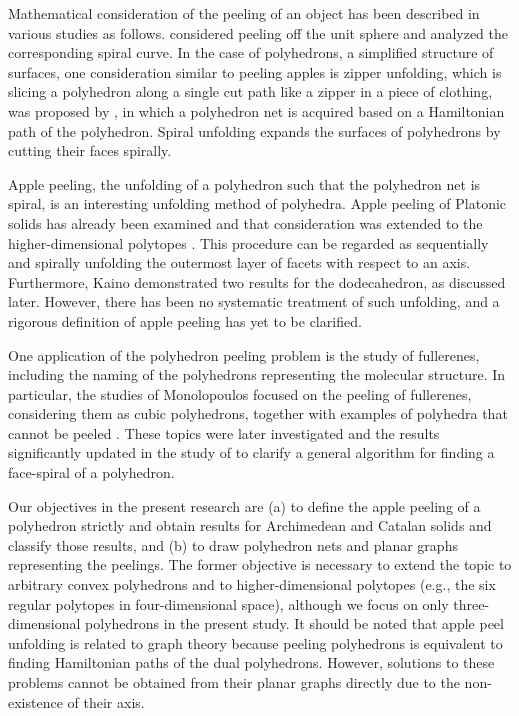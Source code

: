 \documentclass[]{interact}
\theoremstyle{plain}%
\theoremstyle{definition}
\theoremstyle{remark}
\begin{document}
Mathematical consideration of the peeling of an object has been described in various studies as follows. \cite{Bartholdi2012} considered peeling off the unit sphere and analyzed the corresponding spiral curve. In the case of polyhedrons, a simplified structure of surfaces, one consideration similar to peeling apples is zipper unfolding, which is slicing a polyhedron along a single cut path like a zipper in a piece of clothing, was proposed by \cite{Demaine2010}, in which a polyhedron net is acquired based on a Hamiltonian path of the polyhedron. Spiral unfolding \cite{O'Rourke2015} expands the surfaces of polyhedrons by cutting their faces spirally.

Apple peeling, the unfolding of a polyhedron such that the polyhedron net is spiral, is an interesting unfolding method of polyhedra. Apple peeling of Platonic solids has already been examined and that consideration was extended to the higher-dimensional polytopes \citep{Kaino2019}. This procedure can be regarded as sequentially and spirally unfolding the outermost layer of facets with respect to an axis. Furthermore, Kaino demonstrated two results for the dodecahedron, as discussed later. However, there has been no systematic treatment of such unfolding, and a rigorous definition of apple peeling has yet to be clarified. 

One application of the polyhedron peeling problem is the study of fullerenes, including the naming of the polyhedrons representing the molecular structure. In particular, the studies of Monolopoulos \citep{Manolopoulos1991} focused on the peeling of fullerenes, considering them as cubic polyhedrons, together with examples of polyhedra that cannot be peeled \citep{Manolopoulos1993}. These topics were later investigated and the results significantly updated in the study of \cite{WSA2018} to clarify a general algorithm for finding a face-spiral of a polyhedron.


Our objectives in the present research are (a) to define the apple peeling of a polyhedron strictly and obtain results for Archimedean and Catalan solids and classify those results, and
(b) to draw polyhedron nets and planar graphs representing the peelings. 
The former objective is necessary to extend the topic to arbitrary convex polyhedrons and to higher-dimensional polytopes (e.g., the six regular polytopes in four-dimensional space), although we focus on only three-dimensional polyhedrons in the present study. It should be noted that apple peel unfolding is related to graph theory because peeling polyhedrons is equivalent to finding Hamiltonian paths of the dual polyhedrons. However, solutions to these problems cannot be obtained from their planar graphs directly due to the non-existence of their axis.
\end{document}
